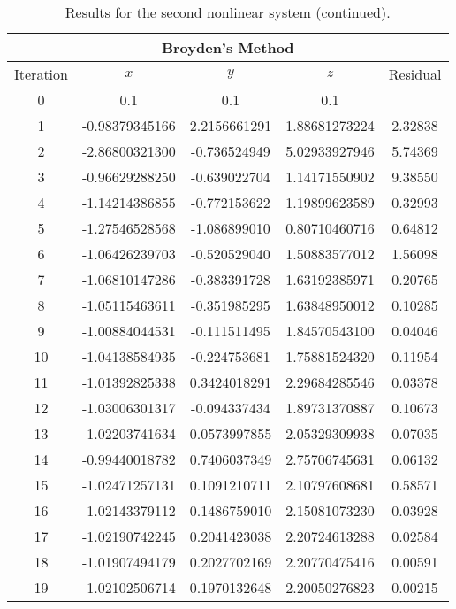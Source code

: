 \begin{table}[H]
    \ContinuedFloat
    \centering
    \caption{Results for the second nonlinear system (continued).}
    \begin{tabular}{ccccc}
        \hline
        \multicolumn{5}{c}{\textbf{Broyden's Method}} \\ \hline
        Iteration & $x$ & $y$ & $z$ & Residual\\
        0 & 0.1 & 0.1 & 0.1 &  \\ 
        1 & -0.98379345166 & 2.2156661291 & 1.88681273224 & 2.32838\\
        2 & -2.86800321300 & -0.736524949 & 5.02933927946 & 5.74369\\
        3 & -0.96629288250 & -0.639022704 & 1.14171550902 & 9.38550\\
        4 & -1.14214386855 & -0.772153622 & 1.19899623589 & 0.32993\\
        5 & -1.27546528568 & -1.086899010 & 0.80710460716 & 0.64812\\
        6 & -1.06426239703 & -0.520529040 & 1.50883577012 & 1.56098\\
        7 & -1.06810147286 & -0.383391728 & 1.63192385971 & 0.20765\\
        8 & -1.05115463611 & -0.351985295 & 1.63848950012 & 0.10285\\
        9 & -1.00884044531 & -0.111511495 & 1.84570543100 & 0.04046\\
        10 & -1.04138584935 & -0.224753681 & 1.75881524320 & 0.11954\\
        11 & -1.01392825338 & 0.3424018291 & 2.29684285546 & 0.03378\\
        12 & -1.03006301317 & -0.094337434 & 1.89731370887 & 0.10673\\
        13 & -1.02203741634 & 0.0573997855 & 2.05329309938 & 0.07035\\
        14 & -0.99440018782 & 0.7406037349 & 2.75706745631 & 0.06132\\
        15 & -1.02471257131 & 0.1091210711 & 2.10797608681 & 0.58571\\
        16 & -1.02143379112 & 0.1486759010 & 2.15081073230 & 0.03928\\
        17 & -1.02190742245 & 0.2041423038 & 2.20724613288 & 0.02584\\
        18 & -1.01907494179 & 0.2027702169 & 2.20770475416 & 0.00591\\
        19 & -1.02102506714 & 0.1970132648 & 2.20050276823 & 0.00215\\

\end{tabular}
\end{table}
